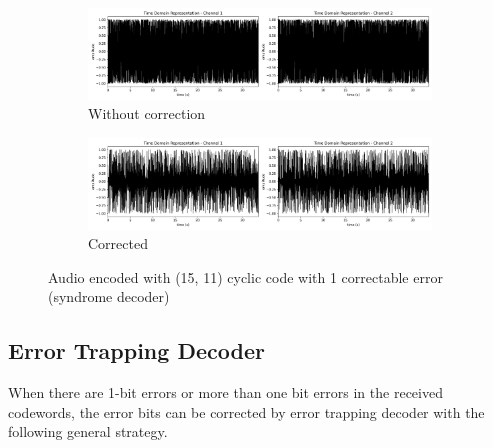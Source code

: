 \documentclass{article}
\begin{document}
\begin{figure}[htb]
    \centering
    \begin{subfigure}[b]{\textwidth}
        \centering
        \includegraphics[width=\textwidth]{../Result/Cyclic/15-11/cyclic-bsc-wav-time-domain-RX.png}
        \caption{Without correction}
        \label{fig:t-audio-cyclic-15-11-no-correction}
    \end{subfigure}
    \begin{subfigure}[b]{\textwidth}
        \centering
        \includegraphics[width=\textwidth]{../Result/Cyclic/15-11/cyclic-bsc-wav-time-domain-RX-syndrome-corrected.png}
        \caption{Corrected}
        \label{fig:t-audio-cyclic-15-11-syndrome-corrected}
    \end{subfigure}
       \caption{Audio encoded with (15, 11) cyclic code with 1 correctable error (syndrome decoder)}
       \label{fig:t-audio-cyclic-15-11-syndrome}
\end{figure}









\subsection{Error Trapping Decoder}
When there are 1-bit errors or more than one bit errors in the received codewords, the error bits can be corrected by error trapping decoder with the following general strategy.
\end{document}
